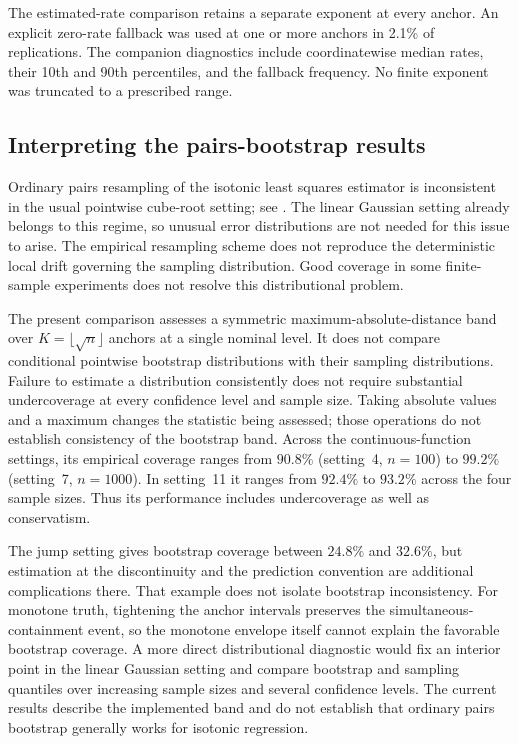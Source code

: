 \documentclass[10pt]{article}
\begin{document}
The estimated-rate comparison retains a separate exponent at every anchor.
An explicit zero-rate fallback was used at one or more anchors in 2.1\%
of replications. The companion diagnostics include coordinatewise median rates,
their 10th and 90th percentiles, and the fallback frequency. No finite exponent
was truncated to a prescribed range.

\subsection{Interpreting the pairs-bootstrap results}
Ordinary pairs resampling of the isotonic least squares estimator is
inconsistent in the usual pointwise cube-root setting; see
\cite[Section~1]{groeneboom2024confidence}. The linear Gaussian setting
already belongs to this regime, so unusual error distributions are not
needed for this issue to arise. The empirical resampling scheme does
not reproduce the deterministic local drift governing the sampling distribution.
Good coverage in some finite-sample experiments does not resolve this
distributional problem.

The present comparison assesses a symmetric maximum-absolute-distance
band over $K=\lfloor\sqrt n\rfloor$ anchors at a single nominal level.
It does not compare conditional pointwise bootstrap distributions with
their sampling distributions. Failure to estimate a distribution
consistently does not require substantial undercoverage at every
confidence level and sample size. Taking absolute values and a maximum
changes the statistic being assessed; those operations do not establish
consistency of the bootstrap band. Across the continuous-function
settings, its empirical coverage ranges from $90.8\%$ (setting~4,
$n=100$) to $99.2\%$ (setting~7, $n=1000$). In setting~11 it ranges
from $92.4\%$ to $93.2\%$ across the four sample sizes. Thus its
performance includes undercoverage as well as conservatism.

The jump setting gives bootstrap coverage between $24.8\%$ and
$32.6\%$, but estimation at the discontinuity and the prediction
convention are additional complications there. That example does not
isolate bootstrap inconsistency. For monotone truth, tightening the
anchor intervals preserves the simultaneous-containment event, so the
monotone envelope itself cannot explain the favorable bootstrap coverage.
A more direct distributional diagnostic would fix an interior point in
the linear Gaussian setting and compare bootstrap and sampling quantiles
over increasing sample sizes and several confidence levels. The current
results describe the implemented band and do not establish that ordinary
pairs bootstrap generally works for isotonic regression.
\end{document}
